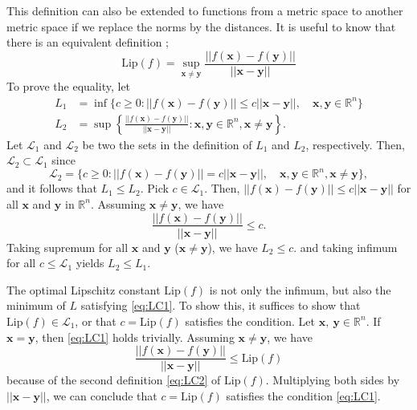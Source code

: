 \documentclass[12pt]{report}
\numberwithin{figure}{chapter}
\theoremstyle{plain}
\theoremstyle{definition}
\theoremstyle{corollary}
\theoremstyle{definition}
\theoremstyle{plain}
\theoremstyle{definition}
\theoremstyle{plain}
\newcommand\bx{\ensuremath{\boldsymbol x}}
\newcommand\by{\ensuremath{\boldsymbol y}}
\newcommand\lip{\ensuremath{\text{Lip}}}
\begin{document}
This definition can also be extended to functions from a metric space to another metric space if we replace the norms by the distances.
It is useful to know that there is an equivalent definition ;
\begin{equation}\label{eq:LC2}
\lip(f)=\sup_{\bx\neq\by}\frac{||f(\bx)-f(\by)||}{||\bx-\by||}
\end{equation}
To prove the equality, let
\begin{equation}\label{eq:equivalent_def}
\begin{aligned}
L_1&=\inf\{c\ge0:||f(\bx)-f(\by)||\le c||\bx-\by||,\quad\bx,\by\in\mathbb R^n\}\\
L_2&=\sup\left\{\frac{||f(\bx)-f(\by)||}{||\bx-\by||}:\bx,\by\in\mathbb R^n,\bx\neq\by\right\}.
\end{aligned}
\end{equation}
Let \(\mathcal L_1\) and \(\mathcal L_2\) be two the sets in the definition of \(L_1\) and \(L_2\), respectively.
Then, \(\mathcal L_2\subset\mathcal L_1\) since
\[\mathcal L_2=\{c\ge0:||f(\bx)-f(\by)||=c||\bx-\by||,\quad\bx,\by\in\mathbb R^n,\bx\neq\by\},\]
and it follows that \(L_1\le L_2\).
Pick \(c\in\mathcal L_1\).
Then, \(||f(\bx)-f(\by)||\le c||\bx-\by||\) for all \(\bx\) and \(\by\) in \(\mathbb R^n\).
Assuming \(\bx\neq \by\), we have
\[
\frac{||f(\bx)-f(\by)||}{||\bx-\by||}\le c.
\]
Taking supremum for all \bx{} and \by{} (\(\bx\neq\by\)), we have \(L_2\le c.\) and taking infimum for all \(c\le\mathcal L_1\) yields \(L_2\le L_1\).

The optimal Lipschitz constant \(\lip(f)\) is not only the infimum, but also the minimum of \(L\) satisfying \eqref{eq:LC1}.
To show this, it suffices to show that \(\lip(f)\in\mathcal L_1\), or that \(c=\lip(f)\) satisfies the condition.
Let \(\bx,\:\by\in\mathbb R^n\).
If \(\bx=\by\), then \eqref{eq:LC1} holds trivially.
Assuming \(\bx\neq\by\), we have
\[
\frac{||f(\bx)-f(\by)||}{||\bx-\by||}\le\lip(f)
\]
because of the second definition \eqref{eq:LC2} of \(\lip(f)\).
Multiplying both sides by \(||\bx-\by||\), we can conclude that \(c=\lip(f)\) satisfies the condition \eqref{eq:LC1}.
\end{document}
